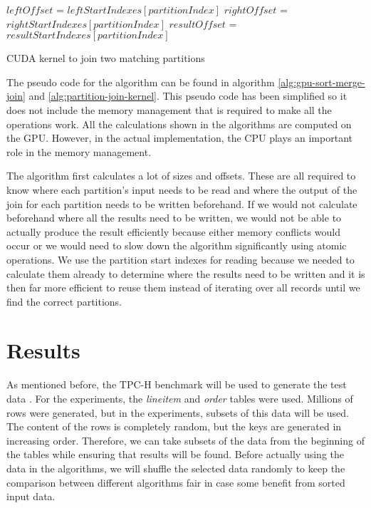 \documentclass[a4paper,titlepage]{article}
\begin{document}
\begin{algorithm}
 \label{alg:partition-join-kernel}
 $leftOffset$ = $leftStartIndexes[partitionIndex]$ \;
 $rightOffset$ = $rightStartIndexes[partitionIndex]$ \;
 $resultOffset$ = $resultStartIndexes[partitionIndex]$ \;
 \;
 \caption{CUDA kernel to join two matching partitions}
\end{algorithm}

The pseudo code for the algorithm can be found in algorithm \ref{alg:gpu-sort-merge-join} and \ref{alg:partition-join-kernel}. This pseudo code has been simplified so it does not include the memory management that is required to make all the operations work. All the calculations shown in the algorithms are computed on the GPU. However, in the actual implementation, the CPU plays an important role in the memory management. 

The algorithm first calculates a lot of sizes and offsets. These are all required to know where each partition's input needs to be read and where the output of the join for each partition needs to be written beforehand. If we would not calculate beforehand where all the results need to be written, we would not be able to actually produce the result efficiently because either memory conflicts would occur or we would need to slow down the algorithm significantly using atomic operations. We use the partition start indexes for reading because we needed to calculate them already to determine where the results need to be written and it is then far more efficient to reuse them instead of iterating over all records until we find the correct partitions.

\section{Results}
\label{sec:results}
As mentioned before, the TPC-H benchmark will be used to generate the test data \cite{tpc-h}. For the experiments, the \emph{lineitem} and \emph{order} tables were used. Millions of rows were generated, but in the experiments, subsets of this data will be used. The content of the rows is completely random, but the keys are generated in increasing order. Therefore, we can take subsets of the data from the beginning of the tables while ensuring that results will be found. Before actually using the data in the algorithms, we will shuffle the selected data randomly to keep the comparison between different algorithms fair in case some benefit from sorted input data.
\end{document}
